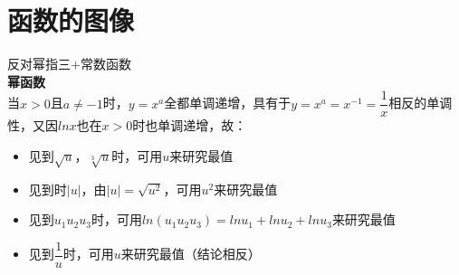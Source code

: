\documentclass{ctexart}
\begin{document}
\section{函数的图像}
\begin{example}[基本初等函数]反对幂指三$+$常数函数\\
\textbf{幂函数}\\
当$x>0$且$a\neq -1$时，$y=x^a$全都单调递增，具有于$y=x^a=x^{-1}=\dfrac{1}{x}$相反的单调性，又因$lnx$也在$x>0$时也单调递增，故：
\begin{itemize}
    \item 见到$\sqrt{u}$，$\sqrt[3]{u}$时，可用$u$来研究最值
    \item 见到时$|u|$，由$|u|=\sqrt{u^2}$，可用$u^2$来研究最值
    \item 见到$u_1 u_2 u_3$时，可用$ln(u_1 u_2 u_3)=lnu_1+lnu_2+lnu_3$来研究最值
    \item 见到$\dfrac{1}{u}$时，可用$u$来研究最值（结论相反）
\end{itemize}



    
\end{example}
\end{document}
